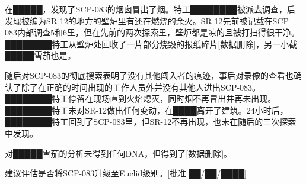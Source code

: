 
在█████，发现了SCP-083的烟囱冒出了烟。特工████████被派去调查，后发现被编为SR-12的地方的壁炉里有还在燃烧的余火。SR-12先前被记载在SCP-083内部调查5和6里，但在先前的两次探索里，壁炉都是凉的且被打扫得很干净。████████特工从壁炉处回收了一片部分烧毁的报纸碎片{[}数据删除]，另一小截█████雪茄也是。

随后对SCP-083的彻底搜索表明了没有其他闯入者的痕迹，事后对录像的查看也确认了除了在正确的时间出现的工作人员外并没有其他人进出SCP-083。████████特工停留在现场直到火焰熄灭，同时烟不再冒出并再未出现。████████特工未对SR-12做出任何变动，在████离开了建筑。24小时后，████████特工回到了SCP-083里，但SR-12不再出现，也未在随后的三次探索中发现。

对█████雪茄的分析未得到任何DNA，但得到了{[}数据删除]。

建议评估是否将SCP-083升级至Euclid级别。{[}批准 ██\slash ██\slash ████]
